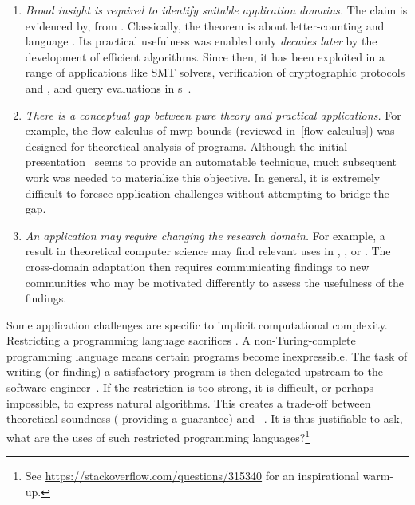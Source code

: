 \begin{enumerate}

\item \emph{Broad insight is required to identify suitable application domains.}
      The claim is evidenced by, \eg {} from . Classically, the theorem is about letter-counting and language
      . Its practical usefulness was enabled only
      \emph{decades later} by the development of efficient algorithms. Since
      then, it has been exploited in a range of applications like SMT solvers,
      verification of cryptographic protocols and
      , and query evaluations in s~\cite[pg. 2]{hague2024}.

\item \emph{There is a conceptual gap between pure theory and practical
      applications.}
      For example, the flow calculus of mwp-bounds (reviewed
      in~\autoref{flow-calculus}) was designed for theoretical analysis of
      programs. Although the initial presentation~\cite{jones2009} seems to
      provide an automatable technique, much subsequent work was needed to
      materialize this objective. In general, it is extremely difficult to
      foresee application challenges without attempting to bridge the gap.

\item \emph{An application may require changing the research domain.}
      For example, a result in theoretical computer science may find relevant
      uses in , , or
      . The cross-domain adaptation then requires
      communicating findings to new communities who may be motivated differently
      to assess the usefulness of the findings.

\end{enumerate}

Some application challenges are specific to implicit computational complexity.
Restricting a programming language sacrifices . A
non-Turing-complete programming language means certain programs become
inexpressible. The task of writing (or finding) a satisfactory program is then
delegated upstream to the software engineer~\cite[p. 14]{moyen2017}. If the
restriction is too strong, it is difficult, or perhaps impossible, to express
natural algorithms. This creates a trade-off between theoretical soundness (\ie
providing a guarantee) and ~\cite{feree2018}. It is thus
justifiable to ask, what are the uses of such restricted programming
languages?\footnote{See \url{https://stackoverflow.com/questions/315340} for an
inspirational warm-up.}

